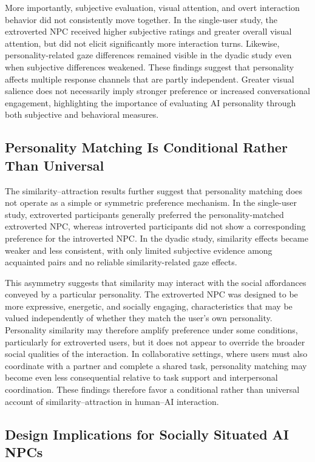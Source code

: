 \documentclass[a4paper,fleqn]{cas-sc}
\begin{document}
More importantly, subjective evaluation, visual attention, and overt interaction behavior did not consistently move together. In the single-user study, the extroverted NPC received higher subjective ratings and greater overall visual attention, but did not elicit significantly more interaction turns. Likewise, personality-related gaze differences remained visible in the dyadic study even when subjective differences weakened. These findings suggest that personality affects multiple response channels that are partly independent. Greater visual salience does not necessarily imply stronger preference or increased conversational engagement, highlighting the importance of evaluating AI personality through both subjective and behavioral measures.

\subsection{Personality Matching Is Conditional Rather Than Universal}

The similarity--attraction results further suggest that personality matching does not operate as a simple or symmetric preference mechanism. In the single-user study, extroverted participants generally preferred the personality-matched extroverted NPC, whereas introverted participants did not show a corresponding preference for the introverted NPC. In the dyadic study, similarity effects became weaker and less consistent, with only limited subjective evidence among acquainted pairs and no reliable similarity-related gaze effects.

This asymmetry suggests that similarity may interact with the social affordances conveyed by a particular personality. The extroverted NPC was designed to be more expressive, energetic, and socially engaging, characteristics that may be valued independently of whether they match the user's own personality. Personality similarity may therefore amplify preference under some conditions, particularly for extroverted users, but it does not appear to override the broader social qualities of the interaction. In collaborative settings, where users must also coordinate with a partner and complete a shared task, personality matching may become even less consequential relative to task support and interpersonal coordination. These findings therefore favor a conditional rather than universal account of similarity--attraction in human--AI interaction.

\subsection{Design Implications for Socially Situated AI NPCs}
\end{document}
